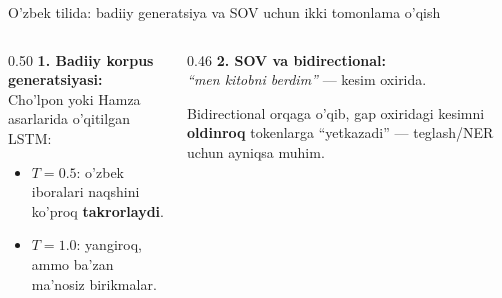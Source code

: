 \documentclass[aspectratio=169,11pt]{beamer}
\begin{document}
\begin{frame}{O'zbek tilida: badiiy generatsiya va SOV uchun ikki tomonlama o'qish}
  \begin{columns}[T]
    \begin{column}{0.50\textwidth}
      \textbf{1. Badiiy korpus generatsiyasi:}\\[3pt]
      \small
      Cho'lpon yoki Hamza asarlarida o'qitilgan LSTM:
      \begin{itemize}\setlength\itemsep{1pt}
        \item $T{=}0.5$: o'zbek iboralari naqshini ko'proq \textbf{takrorlaydi}.
        \item $T{=}1.0$: yangiroq, ammo ba'zan ma'nosiz birikmalar.
      \end{itemize}
    \end{column}
    \begin{column}{0.46\textwidth}
      \textbf{2. SOV va bidirectional:}\\[3pt]
      \small
      \textit{``men kitobni \underline{\hspace{0.5cm}} berdim''} --- kesim oxirida.
      \begin{tcolorbox}[okbox,title=Foyda,top=2pt,bottom=2pt]
        \footnotesize
        Bidirectional orqaga o'qib, gap oxiridagi kesimni \textbf{oldinroq}
        tokenlarga ``yetkazadi'' --- teglash/NER uchun ayniqsa muhim.
      \end{tcolorbox}
    \end{column}
  \end{columns}
\end{frame}
\end{document}
